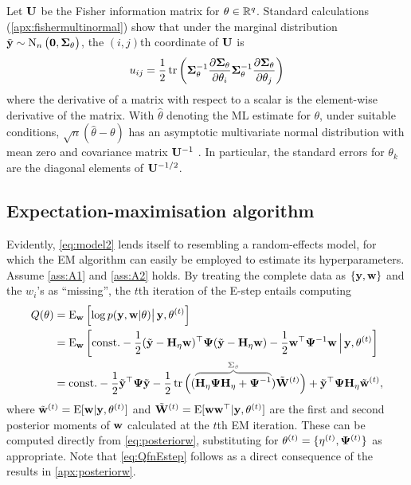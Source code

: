 Let ${\mathbf U}$ be the Fisher information matrix for $\theta \in\mathbb{R}^q$.
Standard calculations (\autoref{apx:fishermultinormal}) show that under the marginal distribution $\tilde{{\mathbf y}} \sim \operatorname{N}_n\big({\mathbf 0}, {\bm\Sigma}_\theta \big)$, the $(i,j)$th coordinate of ${\mathbf U}$ is 
\[
  u_{ij} = 
  \frac{1}{2} \operatorname{tr}\left(
  {\bm\Sigma}_\theta^{-1} \frac{\partial{\bm\Sigma}_\theta}{\partial\theta_i}
  {\bm\Sigma}_\theta^{-1} \frac{\partial{\bm\Sigma}_\theta}{\partial\theta_j} 
  \right)
\]
where the derivative of a matrix with respect to a scalar is the element-wise derivative of the matrix.
With $\hat\theta$ denoting the ML estimate for $\theta$, under suitable conditions, $\surd n (\hat\theta - \theta)$ has an asymptotic multivariate normal distribution with mean zero and covariance matrix ${\mathbf U}^{-1}$ \citep{casella2002statistical}.
In particular, the standard errors for $\theta_k$ are the diagonal elements of ${\mathbf U}^{-1/2}$.

\subsection{Expectation-maximisation algorithm}

Evidently, \eqref{eq:model2} lends itself to resembling a random-effects model, for which the EM algorithm can easily be employed to estimate its hyperparameters.
Assume \ref{ass:A1} and \ref{ass:A2} holds.
By treating the complete data as $\{{\mathbf y},{\mathbf w} \}$ and the $w_i$'s as ``missing'', the $t$th iteration of the E-step entails computing
%
\begin{align}
  Q(\theta) 
  &= \E_\bw \left[ \log p(\by, \bw | \theta) \big\vert\, \by,\theta^{(t)} \right] \nonumber \\
  &= \E_\bw \left[ \const - \half (\tilde\by - \bH_\eta\bw)^\top \bPsi (\tilde\by - \bH_\eta\bw)  - \half \bw^\top\bPsi^{-1}\bw 
  \,\Big\vert\, \by,\theta^{(t)} \right] \label{eq:QfnEstep} \\
  &=  \const - \half \tilde \by^\top \bPsi \tilde \by
  - \half \tr \Big( (
  {\color{gray}
  \overbrace{\color{black}
  \bH_\eta\bPsi\bH_\eta + \bPsi^{-1}
  }^{\bSigma_\theta} 
  }
  )\tilde\bW^{(t)} \Big)
  + \tilde\by^\top \bPsi\bH_\eta\wtilde^{(t)}, \nonumber
\end{align}
%
where $\tilde{{\mathbf w}}^{(t)} = \operatorname{E}[{\mathbf w}|{\mathbf y},\theta^{(t)}]$ and $\tilde{{\mathbf W}}^{(t)} = \operatorname{E}[{\mathbf w}{\mathbf w}^\top|{\mathbf y},\theta^{(t)}]$ are the first and second posterior moments of ${\mathbf w}$ calculated at the $t$th EM iteration.
These can be computed directly from \eqref{eq:posteriorw}, substituting for $\theta^{(t)} = \{\eta^{(t)}, {\bm\Psi}^{(t)} \}$ as appropriate.
Note that \eqref{eq:QfnEstep} follows as a direct consequence of the results in  \autoref{apx:posteriorw}.

